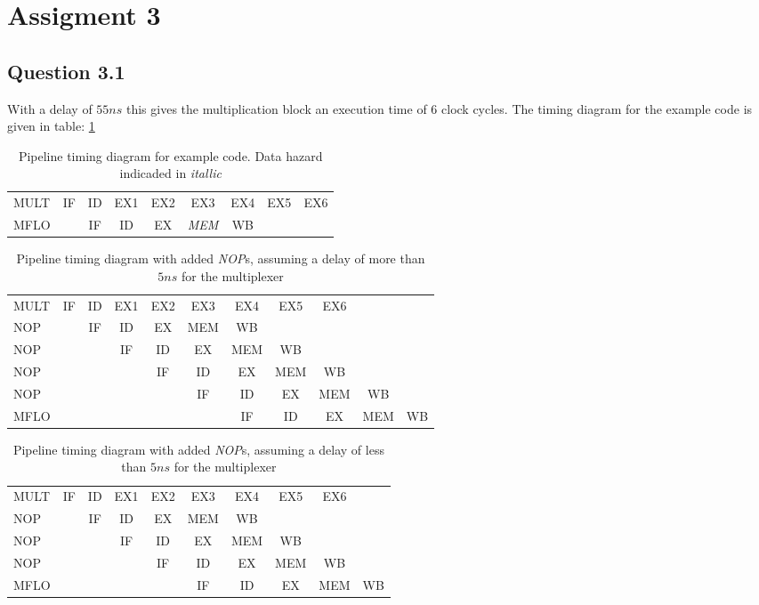 \section{Assigment 3}
\subsection{Question 3.1}
With a delay of $55ns$ this gives the multiplication block an execution time of $6$ clock cycles. The timing diagram for the example code is given in  table: \ref{tab:time1}

\begin{table}[H]
\centering
\begin{tabular}{l | c | c | c | c | c | c | c | c}
MULT & IF  & ID  & EX1 & EX2 & EX3 & EX4 & EX5 & EX6\\
MFLO &     & IF  & ID  & EX  & \emph{MEM} & WB && 
\end{tabular}
\caption{Pipeline timing diagram for example code. Data hazard indicaded in
\emph{itallic}}
\label{tab:time1}
\end{table}

\begin{table}[H]
\centering
\begin{tabular}{l | c | c | c | c | c | c | c | c | c | c |}
MULT	& IF  & ID  & EX1 & EX2 & EX3 & EX4 & EX5 & EX6 && \\
NOP	                                       & & IF  & ID  & EX  & MEM & WB &&&&\\ 
NOP	                                 &&& IF  & ID  & EX  & MEM & WB &&&\\ 
NOP &&&& IF  & ID  & EX  & MEM & WB &&\\
NOP	         &&&&& IF  & ID  & EX  & MEM & WB &\\
MFLO	                              &&&&&& IF  & ID  & EX  & MEM & WB  
\end{tabular}
\caption{Pipeline timing diagram with added \emph{NOP}s, assuming a delay of more than $5ns$ for the multiplexer}
\label{tab:time2}
\end{table}
\begin{table}[H]
\centering
\begin{tabular}{l | c | c | c | c | c | c | c | c | c |}
MULT	& IF  & ID  & EX1 & EX2 & EX3 & EX4 & EX5 & EX6 &\\
NOP	                                       & & IF  & ID  & EX  & MEM & WB &&&\\ 
NOP	                                 &&       & IF  & ID  & EX  & MEM & WB &&\\
NOP                  &&&       & IF  & ID  & EX  & MEM & WB&\\
MFLO	                             &&&&          & IF  & ID  & EX  & MEM & WB \\
\end{tabular}
\caption{Pipeline timing diagram with added \emph{NOP}s, assuming a delay of less than $5ns$ for the multiplexer}
\label{tab:time3}
\end{table}